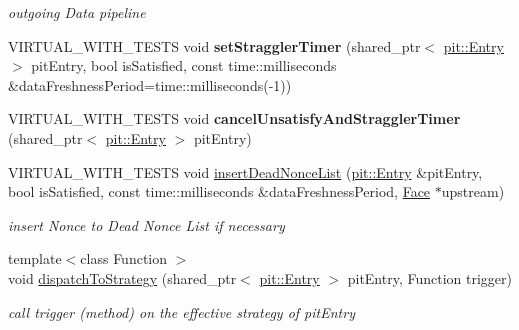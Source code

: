 \begin{DoxyCompactItemize}
\begin{DoxyCompactList}\small\item\em outgoing Data pipeline \end{DoxyCompactList}\item 
V\+I\+R\+T\+U\+A\+L\+\_\+\+W\+I\+T\+H\+\_\+\+T\+E\+S\+TS void {\bfseries set\+Straggler\+Timer} (shared\+\_\+ptr$<$ \hyperlink{classnfd_1_1pit_1_1Entry}{pit\+::\+Entry} $>$ pit\+Entry, bool is\+Satisfied, const time\+::milliseconds \&data\+Freshness\+Period=time\+::milliseconds(-\/1))\hypertarget{classnfd_1_1Forwarder_aaf9d0c6c4c50d67294191cd22c971174}{}\label{classnfd_1_1Forwarder_aaf9d0c6c4c50d67294191cd22c971174}

\item 
V\+I\+R\+T\+U\+A\+L\+\_\+\+W\+I\+T\+H\+\_\+\+T\+E\+S\+TS void {\bfseries cancel\+Unsatisfy\+And\+Straggler\+Timer} (shared\+\_\+ptr$<$ \hyperlink{classnfd_1_1pit_1_1Entry}{pit\+::\+Entry} $>$ pit\+Entry)\hypertarget{classnfd_1_1Forwarder_a3830ee1cb8eee0c60fff472142b6f305}{}\label{classnfd_1_1Forwarder_a3830ee1cb8eee0c60fff472142b6f305}

\item 
V\+I\+R\+T\+U\+A\+L\+\_\+\+W\+I\+T\+H\+\_\+\+T\+E\+S\+TS void \hyperlink{classnfd_1_1Forwarder_a98b6db5bc252cf45462737df27e41b87}{insert\+Dead\+Nonce\+List} (\hyperlink{classnfd_1_1pit_1_1Entry}{pit\+::\+Entry} \&pit\+Entry, bool is\+Satisfied, const time\+::milliseconds \&data\+Freshness\+Period, \hyperlink{classnfd_1_1Face}{Face} $\ast$upstream)
\begin{DoxyCompactList}\small\item\em insert Nonce to Dead Nonce List if necessary \end{DoxyCompactList}\item 
{\footnotesize template$<$class Function $>$ }\\void \hyperlink{classnfd_1_1Forwarder_acc994b71f77a2961184ba675d8d39e43}{dispatch\+To\+Strategy} (shared\+\_\+ptr$<$ \hyperlink{classnfd_1_1pit_1_1Entry}{pit\+::\+Entry} $>$ pit\+Entry, Function trigger)\hypertarget{classnfd_1_1Forwarder_acc994b71f77a2961184ba675d8d39e43}{}\label{classnfd_1_1Forwarder_acc994b71f77a2961184ba675d8d39e43}

\begin{DoxyCompactList}\small\item\em call trigger (method) on the effective strategy of pit\+Entry \end{DoxyCompactList}\end{DoxyCompactItemize}
